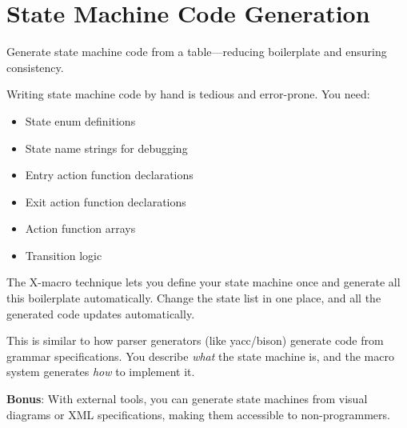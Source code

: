 \section{State Machine Code Generation}

Generate state machine code from a table—reducing boilerplate and ensuring consistency.

Writing state machine code by hand is tedious and error-prone. You need:
\begin{itemize}
    \item State enum definitions
    \item State name strings for debugging
    \item Entry action function declarations
    \item Exit action function declarations
    \item Action function arrays
    \item Transition logic
\end{itemize}

The X-macro technique lets you define your state machine once and generate all this boilerplate automatically. Change the state list in one place, and all the generated code updates automatically.

This is similar to how parser generators (like yacc/bison) generate code from grammar specifications. You describe \textit{what} the state machine is, and the macro system generates \textit{how} to implement it.

\textbf{Bonus}: With external tools, you can generate state machines from visual diagrams or XML specifications, making them accessible to non-programmers.

